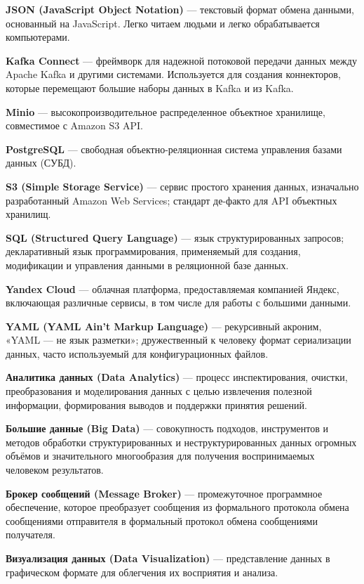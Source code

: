 \textbf{JSON (JavaScript Object Notation)} --- текстовый формат обмена данными, основанный на JavaScript. Легко читаем людьми и легко обрабатывается компьютерами.

\textbf{Kafka Connect} --- фреймворк для надежной потоковой передачи данных между Apache Kafka и другими системами. Используется для создания коннекторов, которые перемещают большие наборы данных в Kafka и из Kafka.

\textbf{Minio} --- высокопроизводительное распределенное объектное хранилище, совместимое с Amazon S3 API.

\textbf{PostgreSQL} --- свободная объектно-реляционная система управления базами данных (СУБД).

\textbf{S3 (Simple Storage Service)} --- сервис простого хранения данных, изначально разработанный Amazon Web Services; стандарт де-факто для API объектных хранилищ.

\textbf{SQL (Structured Query Language)} --- язык структурированных запросов; декларативный язык программирования, применяемый для создания, модификации и управления данными в реляционной базе данных.

\textbf{Yandex Cloud} --- облачная платформа, предоставляемая компанией Яндекс, включающая различные сервисы, в том числе для работы с большими данными.

\textbf{YAML (YAML Ain't Markup Language)} --- рекурсивный акроним, «YAML — не язык разметки»; дружественный к человеку формат сериализации данных, часто используемый для конфигурационных файлов.

\textbf{Аналитика данных (Data Analytics)} --- процесс инспектирования, очистки, преобразования и моделирования данных с целью извлечения полезной информации, формирования выводов и поддержки принятия решений.

\textbf{Большие данные (Big Data)} --- совокупность подходов, инструментов и методов обработки структурированных и неструктурированных данных огромных объёмов и значительного многообразия для получения воспринимаемых человеком результатов.

\textbf{Брокер сообщений (Message Broker)} --- промежуточное программное обеспечение, которое преобразует сообщения из формального протокола обмена сообщениями отправителя в формальный протокол обмена сообщениями получателя.

\textbf{Визуализация данных (Data Visualization)} --- представление данных в графическом формате для облегчения их восприятия и анализа.

